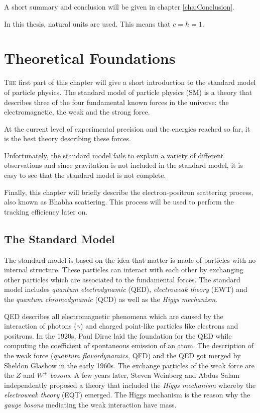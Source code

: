 \documentclass[a4paper,11pt,twosided,final,german,openbib,pdftex,listof=totoc,bibliography=totoc]{scrbook}
\begin{document}
A short summary and conclusion will be given in chapter \ref{cha:Conclusion}.
\newline 

In this thesis, natural units are used. This means that $c = \hbar = 1$.
\newline


\chapter{Theoretical Foundations}
\label{cha:SM}

\lettrine{T}{he} first part of this chapter will give  a short introduction to the standard model of particle physics. The standard model of particle physics (SM) is a theory that describes three of the four fundamental known forces in the universe: the electromagnetic, the weak and the strong force. 

 At the current level of experimental precision and the energies reached so far, it is the best theory describing these forces.
 
 Unfortunately, the standard model fails to explain a variety of different observations and since gravitation is not included in the standard model, it is easy to see that the standard model is not complete.
 
 
 Finally, this chapter will briefly describe the electron-positron scattering process, also known as Bhabha scattering. This process will be used to perform the tracking efficiency later on.
 
 
\section{The Standard Model}
\label{sec:SM}

The standard model is based on the idea that matter is made of particles with no internal structure. These particles can interact with each other by exchanging other particles which are associated to the fundamental forces. The standard model includes \textit{quantum electrodynamic} (QED), \textit{electroweak theory} (EWT) and the \textit{quantum chromodynamic} (QCD) as well as the \textit{Higgs mechanism}.
\newline

QED describes all electromagnetic phenomena which are caused by the interaction of photons ($\gamma$) and charged point-like particles like electrons and positrons. In the 1920s, Paul Dirac laid the foundation for the QED while computing the coefficient of spontaneous emission of an atom. The description of the weak force (\textit{quantum flavordynamics}, QFD) and the QED got merged by Sheldon Glashow in the early 1960s. The exchange particles of the weak force are the $Z$ and $W^{\pm}$ \textit{bosons}. A few years later, Steven Weinberg and Abdus Salam independently proposed a theory that included the \textit{Higgs mechanism} whereby the \textit{electroweak theory} (EQT) emerged. The Higgs mechanism is the reason why the \textit{gauge bosons} mediating the weak interaction have mass.
\end{document}
